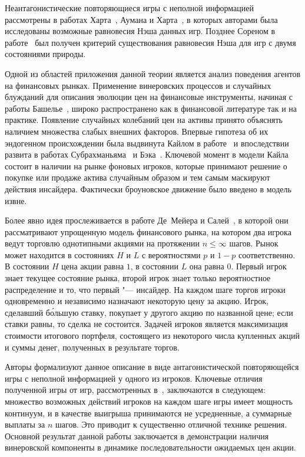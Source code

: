 Неантагонистические повторяющиеся игры с неполной информацией рассмотрены в работах Харта~\cite{hart85}, Аумана и Харта~\cite{aumann86}, в которых авторами была исследованы возможные равновесия Нэша данных игр.
Позднее Сореном в работе~\cite{sorin83} был получен критерий существования равновесия Нэша для игр с двумя состояниями природы.

Одной из областей приложения данной теории является анализ поведения агентов на финансовых рынках.
Применение винеровских процессов и случайных блужданий для описания эволюции цен на финансовые инструменты, начиная с работы Башелье~\cite{bachelier1900}, широко распространено как в финансовой литературе так и на практике.
Появление случайных колебаний цен на активы принято объяснять наличием множества слабых внешних факторов.
Впервые гипотеза об их эндогенном происхождении была выдвинута Кайлом в работе~\cite{kyle85} и впоследствии развита в работах Субрахманьяма~\cite{subrahmanyam91} и Бэка~\cite{back95}.
Ключевой момент в модели Кайла состоит в наличии на рынке фоновых игроков, которые принимают решение о покупке или продаже актива случайным образом и тем самым маскируют действия инсайдера.
Фактически броуновское движение было введено в модель извне.

Более явно идея прослеживается в работе Де~Мейера и Салей~\cite{demeyer02}, в которой они рассматривают упрощенную модель финансового рынка, на котором два
игрока ведут торговлю однотипными акциями на протяжении $n \leq \infty$ шагов.
Рынок может находится в состояниях $H$ и $L$ с вероятностями $p$ и $1-p$ соответственно.
В состоянии $H$ цена акции равна $1$, в состоянии $L$ она равна $0$.
Первый игрок знает текущее состояние рынка, второй игрок знает только вероятностное распределение и то, что первый "--- инсайдер.
На каждом шаге торгов игроки одновременно и независимо назначают некоторую цену за акцию.
Игрок, сделавший б\'{о}льшую ставку, покупает у другого акцию по названной цене; если ставки равны, то сделка не состоится.
Задачей игроков является максимизация стоимости итогового портфеля, состоящего из некоторого числа купленных акций и суммы денег, полученных в результате торгов.

Авторы формализуют данное описание в виде антагонистической повторяющейся игры с неполной информацией у одного из игроков.
Ключевые отличия полученной игры от игр, рассмотренных в~\cite{aumann95}, заключаются в следующем: множество возможных действий игроков на каждом шаге игры имеет мощность континуум, и в качестве выигрыша принимаются не усредненные, а суммарные выплаты за $n$ шагов.
Это приводит к существенно отличной технике решения. Основной результат данной работы заключается в демонстрации наличия винеровской компоненты в динамике последовательности ожидаемых цен акции.

